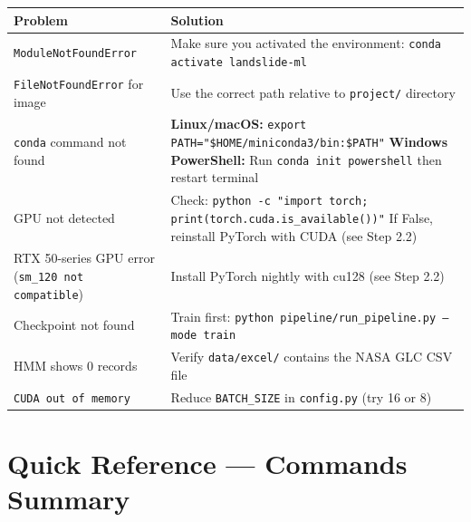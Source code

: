 \documentclass[11pt]{article}
\begin{document}
\begin{table}[H]
    \centering
    \renewcommand{\arraystretch}{1.5}
    \begin{tabular}{p{5.5cm}p{8.5cm}}
        \toprule
        \textbf{Problem} & \textbf{Solution} \\
        \midrule
        \texttt{ModuleNotFoundError} & Make sure you activated the environment: \texttt{conda activate landslide-ml} \\
        \texttt{FileNotFoundError} for image & Use the correct path relative to \texttt{project/} directory \\
        \texttt{conda} command not found & \textbf{Linux/macOS:} \texttt{export PATH="\$HOME/miniconda3/bin:\$PATH"} \newline \textbf{Windows PowerShell:} Run \texttt{conda init powershell} then restart terminal \\
        GPU not detected & Check: \texttt{python -c "import torch; print(torch.cuda.is\_available())"} \newline If False, reinstall PyTorch with CUDA (see Step 2.2) \\
        RTX 50-series GPU error \newline (\texttt{sm\_120 not compatible}) & Install PyTorch nightly with cu128 (see Step 2.2) \\
        Checkpoint not found & Train first: \texttt{python pipeline/run\_pipeline.py --mode train} \\
        HMM shows 0 records & Verify \texttt{data/excel/} contains the NASA GLC CSV file \\
        \texttt{CUDA out of memory} & Reduce \texttt{BATCH\_SIZE} in \texttt{config.py} (try 16 or 8) \\
        \bottomrule
    \end{tabular}
\end{table}

\section{Quick Reference --- Commands Summary}
\end{document}
